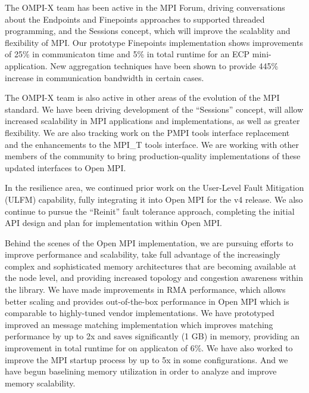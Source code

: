 
The OMPI-X team has been active in the MPI Forum, driving
conversations about the Endpoints and Finepoints approaches to
supported threaded programming, and the Sessions concept, which will
improve the scalablity and flexibility of MPI.  Our prototype
Finepoints implementation shows improvements of 25\% in communicaton
time and 5\% in total runtime for an ECP mini-application.  New
aggregation techniques have been shown to provide 445\% increase in
communication bandwidth in certain cases.

The OMPI-X team is also active in other areas of the evolution of the
MPI standard. We have been driving development of the ``Sessions''
concept, will allow increased scalability in MPI applications and
implementations, as well as greater flexibility.
%
We are also tracking work on the PMPI tools interface replacement and
the enhancements to the MPI\_T tools interface.  We are working with
other members of the community to bring production-quality
implementations of these updated interfaces to Open MPI.

In the resilience area, we continued prior work on the User-Level
Fault Mitigation (ULFM) capability, fully integrating it into Open MPI
for the v4 release.  We also continue to pursue the ``Reinit'' fault
tolerance approach, completing the initial API design and plan for
implementation within Open MPI.

Behind the scenes of the Open MPI implementation, we are pursuing
efforts to improve performance and scalability, take full advantage of
the increasingly complex and sophisticated memory architectures that
are becoming available at the node level, and providing increased
topology and congestion awareness within the library.  We have made
improvements in RMA performance, which allows better scaling and
provides out-of-the-box performance in Open MPI which is comparable to
highly-tuned vendor implementations.  We have prototyped improved an
message matching implementation which improves matching performance by
up to 2x and saves significantly (1 GB) in memory, providing an
improvement in total runtime for on applicaton of 6\%.  We have also
worked to improve the MPI startup process by up to 5x in some
configurations.  And we have begun baselining memory utilization
in order to analyze and improve memory scalability.


